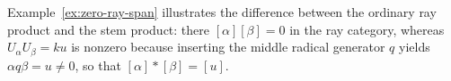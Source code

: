 Example~\ref{ex:zero-ray-span} illustrates the difference between the ordinary ray product and the stem product: there $[\alpha][\beta]=0$ in the ray category, whereas $U_\alpha U_\beta=ku$ is nonzero because inserting the middle radical generator $q$ yields $\alpha q\beta=u\ne0$, so that $[\alpha]*[\beta]=[u]$.
